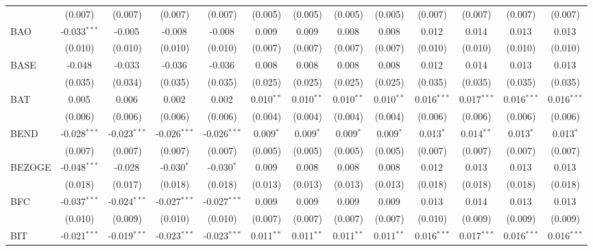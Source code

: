 \begin{table}[!htbp]
\begin{tabular}{@{\extracolsep{5pt}}lcccccccccccc}
  & (0.007) & (0.007) & (0.007) & (0.007) & (0.005) & (0.005) & (0.005) & (0.005) & (0.007) & (0.007) & (0.007) & (0.007) \\
 BAO & -0.033$^{***}$ & -0.005$^{}$ & -0.008$^{}$ & -0.008$^{}$ & 0.009$^{}$ & 0.009$^{}$ & 0.008$^{}$ & 0.008$^{}$ & 0.012$^{}$ & 0.014$^{}$ & 0.013$^{}$ & 0.013$^{}$ \\
  & (0.010) & (0.010) & (0.010) & (0.010) & (0.007) & (0.007) & (0.007) & (0.007) & (0.010) & (0.010) & (0.010) & (0.010) \\
 BASE & -0.048$^{}$ & -0.033$^{}$ & -0.036$^{}$ & -0.036$^{}$ & 0.008$^{}$ & 0.008$^{}$ & 0.008$^{}$ & 0.008$^{}$ & 0.012$^{}$ & 0.014$^{}$ & 0.013$^{}$ & 0.013$^{}$ \\
  & (0.035) & (0.034) & (0.035) & (0.035) & (0.025) & (0.025) & (0.025) & (0.025) & (0.035) & (0.035) & (0.035) & (0.035) \\
 BAT & 0.005$^{}$ & 0.006$^{}$ & 0.002$^{}$ & 0.002$^{}$ & 0.010$^{**}$ & 0.010$^{**}$ & 0.010$^{**}$ & 0.010$^{**}$ & 0.016$^{***}$ & 0.017$^{***}$ & 0.016$^{***}$ & 0.016$^{***}$ \\
  & (0.006) & (0.006) & (0.006) & (0.006) & (0.004) & (0.004) & (0.004) & (0.004) & (0.006) & (0.006) & (0.006) & (0.006) \\
 BEND & -0.028$^{***}$ & -0.023$^{***}$ & -0.026$^{***}$ & -0.026$^{***}$ & 0.009$^{*}$ & 0.009$^{*}$ & 0.009$^{*}$ & 0.009$^{*}$ & 0.013$^{*}$ & 0.014$^{**}$ & 0.013$^{*}$ & 0.013$^{*}$ \\
  & (0.007) & (0.007) & (0.007) & (0.007) & (0.005) & (0.005) & (0.005) & (0.005) & (0.007) & (0.007) & (0.007) & (0.007) \\
 BEZOGE & -0.048$^{***}$ & -0.028$^{}$ & -0.030$^{*}$ & -0.030$^{*}$ & 0.009$^{}$ & 0.008$^{}$ & 0.008$^{}$ & 0.008$^{}$ & 0.012$^{}$ & 0.013$^{}$ & 0.013$^{}$ & 0.013$^{}$ \\
  & (0.018) & (0.017) & (0.018) & (0.018) & (0.013) & (0.013) & (0.013) & (0.013) & (0.018) & (0.018) & (0.018) & (0.018) \\
 BFC & -0.037$^{***}$ & -0.024$^{***}$ & -0.027$^{***}$ & -0.027$^{***}$ & 0.009$^{}$ & 0.009$^{}$ & 0.009$^{}$ & 0.009$^{}$ & 0.013$^{}$ & 0.014$^{}$ & 0.013$^{}$ & 0.013$^{}$ \\
  & (0.010) & (0.009) & (0.010) & (0.010) & (0.007) & (0.007) & (0.007) & (0.007) & (0.010) & (0.009) & (0.009) & (0.009) \\
 BIT & -0.021$^{***}$ & -0.019$^{***}$ & -0.023$^{***}$ & -0.023$^{***}$ & 0.011$^{**}$ & 0.011$^{**}$ & 0.011$^{**}$ & 0.011$^{**}$ & 0.016$^{***}$ & 0.017$^{***}$ & 0.016$^{***}$ & 0.016$^{***}$ \\

\end{tabular}
\end{table}
